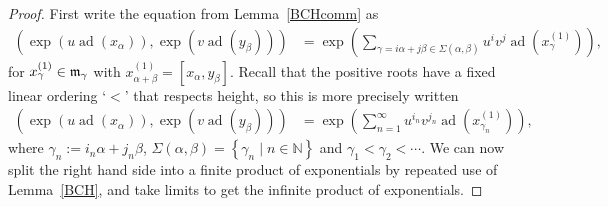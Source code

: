\documentclass[11pt,letterpaper]{amsart}
\newcounter{thecounter}
\numberwithin{thecounter}{section}
\newtheorem{lemma}[thecounter]{Lemma}
\theoremstyle{definition}
\DeclareMathOperator{\ad}{ad}
\renewcommand{\a}{\alpha}
\renewcommand{\b}{\beta}
\newcommand{\g}{\gamma}
\newcommand{\N}{{\mathbb N}}
\newcommand{\Uhp}{{\widehat{U}^+}}
\begin{document}
\begin{shortver}
\begin{proof} 
First write the equation from Lemma~\ref{BCHcomm}  as
\begin{align*}
 \left(\exp\left(u\ad\left(x_\a\right)\right),\exp\left(v\ad\left(y_\b\right)\right)\right) &= 
    \exp\left( \sum_{\g=i\a+j\b\in\Sigma(\a,\b)} u^i v^j\ad\left(x^{(1)}_{\g}\right) \right), 
\end{align*}
for $x^{(1)}_\g\in {\frak m}_{\g}$ with $x^{(1)}_{\a+\b}=\left[x_\a,y_\b\right]$.
Recall that the positive roots have a fixed linear ordering `$<$' that respects height, so this is more precisely written
\begin{align*}
\left(\exp\left(u\ad\left(x_\a\right)\right),\exp\left(v\ad\left(y_\b\right)\right)\right) &= 
    \exp\left( \sum_{n=1}^\infty u^{i_n} v^{j_n} \ad\left(x^{(1)}_{\g_n}\right) \right), 
\end{align*}
where $\g_n := i_n\a+j_n\b$, $\Sigma(\a,\b)=\left\{\g_n \mid n\in\N\right\}$ and $\g_1< \g_2<\cdots$.
We can now split the right hand side into a finite  product of exponentials by repeated use of Lemma~\ref{BCH}, and take limits to get the infinite product of exponentials.
\end{proof}
\end{shortver}


%
\end{document}
